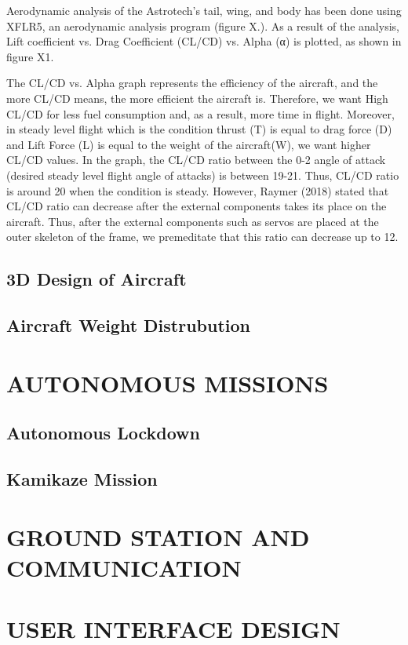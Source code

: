 \documentclass[12pt]{article}
\begin{document}
Aerodynamic analysis of the Astrotech’s tail, wing, and body has been done using XFLR5, an aerodynamic analysis program (figure X.). As a result of the analysis, Lift coefficient vs. Drag Coefficient (CL/CD) vs. Alpha (α) is plotted, as shown in figure X1. %

The CL/CD vs. Alpha graph represents the efficiency of the aircraft, and the more CL/CD means, the more efficient the aircraft is. Therefore, we want High CL/CD for less fuel consumption and, as a result, more time in flight. Moreover, in steady level flight which is the condition thrust (T) is equal to drag force (D) and Lift Force (L) is equal to the weight of the aircraft(W), we want higher CL/CD values. In the graph, the CL/CD ratio between the 0-2 angle of attack (desired steady level flight angle of attacks) is between 19-21.  Thus, CL/CD ratio is around 20 when the condition is steady. However, Raymer (2018) stated that CL/CD ratio can decrease after the external components takes its place on the aircraft. Thus, after the external components such as servos are placed at the outer skeleton of the frame, we premeditate that this ratio can decrease up to 12. 


\subsection{3D Design of Aircraft}
\subsection{Aircraft Weight Distrubution}



\section{AUTONOMOUS MISSIONS}
\subsection{Autonomous Lockdown}
\subsection{Kamikaze Mission}

\section{GROUND STATION AND COMMUNICATION}

\section{USER INTERFACE DESIGN}
\end{document}
